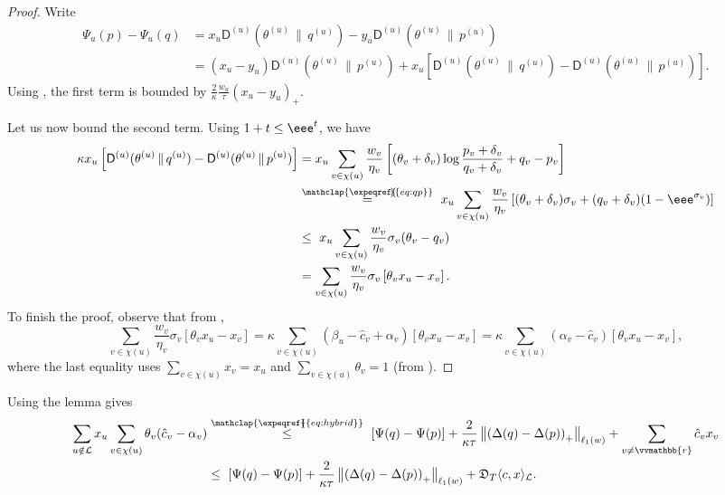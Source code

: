 \documentclass{toc}
\newcommand{\calL}{\mathcal L}
\newcommand{\dmid}{\,\|\,}
\newcommand{\depth}{\mathfrak{D}}
\newcommand{\vvr}{\vvmathbb{r}}
\newcommand{\sfD}{\mathsf D}
\begin{document}
\begin{proof}
	Write
	\begin{align*}
	\Psi_u(p) - \Psi_u(q) &= 
	x_u \sfD^{(u)}\left(\theta^{(u)} \dmid q^{(u)}\right) 
	-y_u \sfD^{(u)}\left(\theta^{(u)} \dmid p^{(u)}\right)  \\
	&= (x_u-y_u) \sfD^{(u)}(\theta^{(u)} \dmid p^{(u)}) + x_u \left[\sfD^{(u)}(\theta^{(u)} \dmid q^{(u)})-\sfD^{(u)}(\theta^{(u)} \dmid p^{(u)})\right].
	\end{align*}
	Using , the first term is bounded by $\frac{2}{\kappa} \frac{w_u}{\tau} (x_u-y_u)_+ $.
	
	Let us now bound the second term.
	Using $1+t \leq \eee^t$, we have
	\begin{align*}
	\kappa x_u \left[\sfD^{(u)}(\theta^{(u)} \dmid q^{(u)})-\sfD^{(u)}(\theta^{(u)} \dmid p^{(u)})\right] &=
	x_u \sum_{v \in \chi(u)} \frac{w_v}{\eta_v} \left[(\theta_v+\delta_v) \log \frac{p_v+\delta_v}{q_v+\delta_v}+q_v-p_v\right] \\
	\  &\stackrel{\mathclap{\expeqref{\!\!\!\!}{eq:qp}}}{=}\ 
	x_u \sum_{v \in \chi(u)} \frac{w_v}{\eta_v} \left[(\theta_v+\delta_v) \sigma_v + (q_v+\delta_v) (1-\eee^{\sigma_v})\right] \\
	&\leq\ 
	x_u \sum_{v \in \chi(u)} \frac{w_v}{\eta_v} \sigma_v (\theta_v-q_v) \\
	&= \sum_{v \in \chi(u)} \frac{w_v}{\eta_v} \sigma_v \left[\theta_v x_u - x_v\right].
	\end{align*}
	To finish the proof, observe that from \expeqref{equation}{eq:kkt2},
	\[
	\sum_{v \in \chi(u)} \frac{w_v}{\eta_v} \sigma_v \left[\theta_v x_u - x_v\right] =
	\kappa \sum_{v \in \chi(u)} (\beta_u - \hat{c}_v + \alpha_v) \left[\theta_v x_u - x_v\right] =
	\kappa \sum_{v \in \chi(u)} (\alpha_v - \hat{c}_v) \left[\theta_v x_u - x_v\right],
	\]
	where the last equality uses $\sum_{v \in \chi(u)} x_v = x_u$ and $\sum_{v \in \chi(u)} \theta_v = 1$ (from ).
\end{proof}

Using the lemma gives
\begin{align*}
\sum_{u \notin \calL} x_u \sum_{v \in \chi(u)} \theta_v (\hat{c}_v-\alpha_v) 
&\stackrel{\mathclap{\expeqref{\!\!\!}{eq:hybrid}}}{\leq}\ 
[\Psi(q)-\Psi(p)] + \frac{2}{\kappa \tau} \left\|\left(\Delta(q)-\Delta(p)\right)_{+}\right\|_{\ell_1(w)}
+ \sum_{v \neq \vvr} \hat{c}_v x_v \\
&\leq\ 
[\Psi(q)-\Psi(p)] + \frac{2}{\kappa \tau} \left\|\left(\Delta(q)-\Delta(p)\right)_{+}\right\|_{\ell_1(w)}
+ \depth_T \langle c,x\rangle_{\calL}.
\end{align*}
\end{document}
